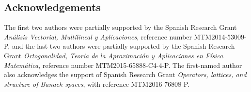 \documentclass[11pt, leqno]{amsart}
\theoremstyle{remark}
\numberwithin{equation}{section}
\begin{document}
\subsection*{Acknowledgements}
The first two authors were partially supported by the Spanish Research Grant \textit{An\'alisis Vectorial, Multilineal y Aplicaciones}, reference number MTM2014-53009-P, and the last two authors were partially supported by the Spanish Research Grant \textit{Ortogonalidad, Teor\'ia de la Aproximaci\'on y Aplicaciones en F\'isica Matem\'atica}, reference number MTM2015-65888-C4-4-P. The first-named author also acknowledges the support of Spanish Research Grant \textit{Operators, lattices, and structure of Banach spaces}, 
with reference  MTM2016-76808-P.

\end{document}
